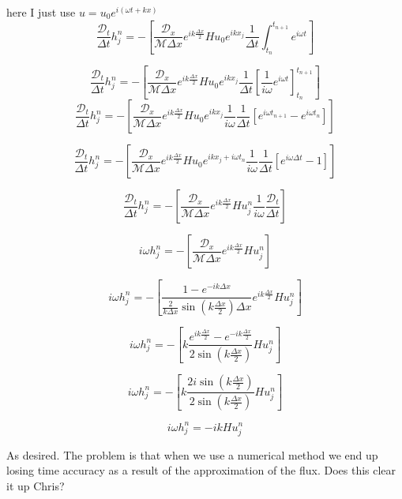 \documentclass[12pt]{article}
\begin{document}
here I just use $u = u_0 e^{i \left(\omega t + k x\right)}$
\[\frac{\mathcal{D}_t}{\Delta t} h_j^{n} = -\left[\frac{\mathcal{D}_x}{ \mathcal{M} \Delta x} e^{ik \frac{\Delta x}{2}} Hu_0e^{i k x_j} \frac{1}{\Delta t}\int_{t_{n}}^{t_{n+1}}e^{i\omega t} \right]\]

\[\frac{\mathcal{D}_t}{\Delta t} h_j^{n} = -\left[\frac{\mathcal{D}_x}{ \mathcal{M} \Delta x} e^{ik \frac{\Delta x}{2}}Hu_0e^{i k x_j} \frac{1}{\Delta t}\left[\frac{1}{i \omega}e^{i\omega t}\right]_{t_{n}}^{t_{n+1}} \right]\]
\[\frac{\mathcal{D}_t}{\Delta t} h_j^{n} = -\left[\frac{\mathcal{D}_x}{ \mathcal{M} \Delta x} e^{ik \frac{\Delta x}{2}}Hu_0e^{i k x_j} \frac{1}{i \omega}\frac{1}{\Delta t} \left[e^{i\omega t_{n+1}} - e^{i\omega t_{n}}\right] \right]\]

\[\frac{\mathcal{D}_t}{\Delta t} h_j^{n} = -\left[\frac{\mathcal{D}_x}{ \mathcal{M} \Delta x} e^{ik \frac{\Delta x}{2}}Hu_0e^{i k x_j +i\omega t_{n} } \frac{1}{i \omega}\frac{1}{\Delta t} \left[e^{i\omega \Delta t} - 1\right] \right]\]

\[\frac{\mathcal{D}_t}{\Delta t} h_j^{n} = -\left[\frac{\mathcal{D}_x}{ \mathcal{M} \Delta x} e^{ik \frac{\Delta x}{2}}Hu^n_j \frac{1}{i \omega}\frac{\mathcal{D}_t}{\Delta t} \right]\]

\[i \omega h_j^{n} = -\left[\frac{\mathcal{D}_x}{ \mathcal{M} \Delta x} e^{ik \frac{\Delta x}{2}}Hu^n_j \right]\]

\[i \omega h_j^{n} = -\left[\frac{1 - e^{-ik\Delta x}}{ \frac{2}{k \Delta x} \sin\left(k \frac{\Delta x}{2} \right) \Delta x} e^{ik \frac{\Delta x}{2}}Hu^n_j \right]\]

\[i \omega h_j^{n} = -\left[k\frac{e^{ik \frac{\Delta x}{2}} - e^{-ik \frac{\Delta x}{2}}}{ 2 \sin\left(k \frac{\Delta x}{2} \right)} Hu^n_j \right]\]

\[i \omega h_j^{n} = -\left[k\frac{2 i \sin\left(k \frac{\Delta x}{2} \right)}{ 2 \sin\left(k \frac{\Delta x}{2} \right)} Hu^n_j \right]\]

\[i \omega h_j^{n} = -ik Hu^n_j \]

As desired. The problem is that when we use a numerical method we end up losing time accuracy as a result of the approximation of the flux. Does this clear it up Chris?
\end{document}
